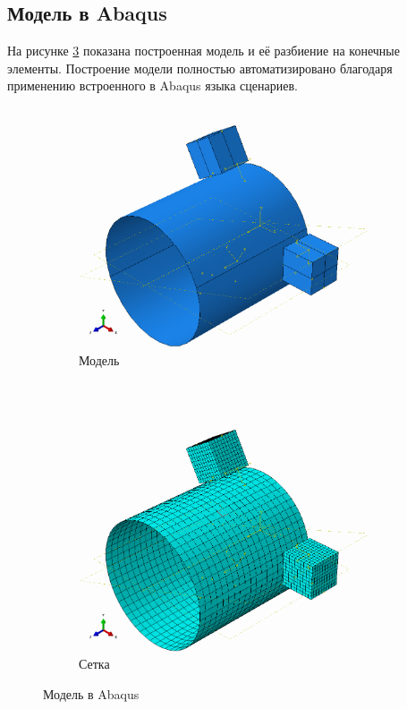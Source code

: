 \documentclass[14pt,oneside,final]{extreport}
\begin{document}
	\subsection{Модель в Abaqus}
	На рисунке \ref{fig:abaqus-model} показана построенная модель и её разбиение на конечные элементы. Построение модели полностью автоматизировано благодаря применению встроенного в Abaqus языка сценариев.

	\begin{figure}[h!]
		\centering
		\begin{subfigure}[t]{0.5\textwidth}
			\centering
			\includegraphics[scale=0.28]{img/model} 
			\caption{Модель} \label{fig:abaqus-model-a}
		\end{subfigure}%
		~ 
		\begin{subfigure}[t]{0.5\textwidth}
			\centering
			\includegraphics[scale=0.28]{img/modelMesh} 
			\caption{Сетка} \label{fig:abaqus-model-b}
		\end{subfigure}
		\caption{Модель в Abaqus} \label{fig:abaqus-model}
	\end{figure}
\end{document}

